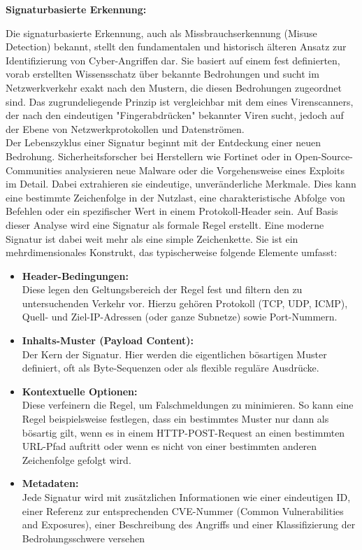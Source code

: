 \textbf{Signaturbasierte Erkennung:}

Die signaturbasierte Erkennung, auch als Missbrauchserkennung (Misuse Detection) bekannt, stellt den fundamentalen und historisch älteren Ansatz zur Identifizierung von Cyber-Angriffen dar. Sie basiert auf einem fest definierten, vorab erstellten Wissensschatz über bekannte Bedrohungen und sucht im Netzwerkverkehr exakt nach den Mustern, die diesen Bedrohungen zugeordnet sind. Das zugrundeliegende Prinzip ist vergleichbar mit dem eines Virenscanners, der nach den eindeutigen "Fingerabdrücken" bekannter Viren sucht, jedoch auf der Ebene von Netzwerkprotokollen und Datenströmen.\\

Der Lebenszyklus einer Signatur beginnt mit der Entdeckung einer neuen Bedrohung. Sicherheitsforscher bei Herstellern wie Fortinet oder in Open-Source-Communities analysieren neue Malware oder die Vorgehensweise eines Exploits im Detail. Dabei extrahieren sie eindeutige, unveränderliche Merkmale. Dies kann eine bestimmte Zeichenfolge in der Nutzlast, eine charakteristische Abfolge von Befehlen oder ein spezifischer Wert in einem Protokoll-Header sein. Auf Basis dieser Analyse wird eine Signatur als formale Regel erstellt. Eine moderne Signatur ist dabei weit mehr als eine simple Zeichenkette. Sie ist ein mehrdimensionales Konstrukt, das typischerweise folgende Elemente umfasst:\\
\begin{itemize}
	\item \textbf{Header-Bedingungen:} \\Diese legen den Geltungsbereich der Regel fest und filtern den zu untersuchenden Verkehr vor. Hierzu gehören Protokoll (TCP, UDP, ICMP), Quell- und Ziel-IP-Adressen (oder ganze Subnetze) sowie Port-Nummern.\\
	\item \textbf{Inhalts-Muster (Payload Content):} \\Der Kern der Signatur. Hier werden die eigentlichen bösartigen Muster definiert, oft als Byte-Sequenzen oder als flexible reguläre Ausdrücke.\\
	\item \textbf{Kontextuelle Optionen: } \\Diese verfeinern die Regel, um Falschmeldungen zu minimieren. So kann eine Regel beispielsweise festlegen, dass ein bestimmtes Muster nur dann als bösartig gilt, wenn es in einem HTTP-POST-Request an einen bestimmten URL-Pfad auftritt oder wenn es nicht von einer bestimmten anderen Zeichenfolge gefolgt wird.\\
	\item \textbf{Metadaten:} \\Jede Signatur wird mit zusätzlichen Informationen wie einer eindeutigen ID, einer Referenz zur entsprechenden CVE-Nummer (Common Vulnerabilities and Exposures), einer Beschreibung des Angriffs und einer Klassifizierung der Bedrohungsschwere versehen
\end{itemize}

